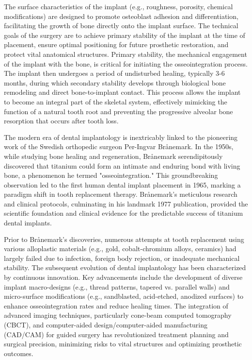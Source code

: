 The surface characteristics of the implant (e.g., roughness, porosity, chemical modifications) are designed to promote osteoblast adhesion and differentiation, facilitating the growth of bone directly onto the implant surface. The technical goals of the surgery are to achieve primary stability of the implant at the time of placement, ensure optimal positioning for future prosthetic restoration, and protect vital anatomical structures. Primary stability, the mechanical engagement of the implant with the bone, is critical for initiating the osseointegration process. The implant then undergoes a period of undisturbed healing, typically 3-6 months, during which secondary stability develops through biological bone remodeling and direct bone-to-implant contact. This process allows the implant to become an integral part of the skeletal system, effectively mimicking the function of a natural tooth root and preventing the progressive alveolar bone resorption that occurs after tooth loss.

The modern era of dental implantology is inextricably linked to the pioneering work of the Swedish orthopedic surgeon Per-Ingvar Br\aa{}nemark. In the 1950s, while studying bone healing and regeneration, Br\aa{}nemark serendipitously discovered that titanium could form an intimate and enduring bond with living bone, a phenomenon he termed "osseointegration." This groundbreaking observation led to the first human dental implant placement in 1965, marking a paradigm shift in tooth replacement therapy. Br\aa{}nemark's meticulous research and clinical protocols, culminating in his landmark 1977 publication, provided the scientific foundation and clinical evidence for the predictable success of titanium dental implants.

Prior to Br\aa{}nemark's discoveries, numerous attempts at tooth replacement using various alloplastic materials (e.g., gold, cobalt-chromium alloys, ceramics) had largely failed due to infection, foreign body rejection, or inadequate mechanical stability. The subsequent evolution of dental implantology has been characterized by continuous innovation. Key advancements include the development of diverse implant macro-designs (e.g., thread patterns, tapered vs. parallel walls) and micro-surface modifications (e.g., sandblasted, acid-etched, anodized surfaces) to enhance osseointegration rates and reduce healing times. The integration of advanced imaging techniques, particularly cone-beam computed tomography (CBCT), and computer-aided design/computer-aided manufacturing (CAD/CAM) for guided surgery has revolutionized treatment planning and surgical precision, minimizing risks to vital structures and optimizing prosthetic outcomes.

